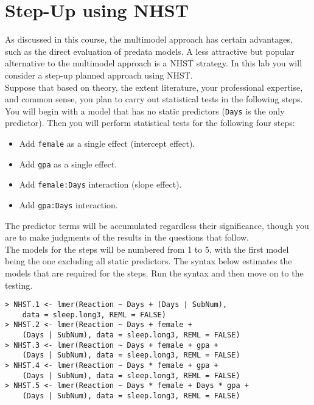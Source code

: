 \documentclass[]{article}
\begin{document}
%
%

\section*{Step-Up using NHST}

\noindent As discussed in this course, the multimodel approach has certain advantages, such as the direct evaluation of predata models. A less attractive but popular alternative to the multimodel approach is a NHST strategy. In this lab you will consider a step-up planned approach using NHST.\\
\linebreak
Suppose that based on theory, the extent literature, your professional expertise, and common sense, you plan to carry out statistical tests in the following steps. You will begin with a model that has no static predictors (\texttt{Days} is the only predictor). Then you will perform statistical tests for the following four steps:

\begin{itemize}
\item Add \texttt{female} as a single effect (intercept effect).
\item Add \texttt{gpa} as a single effect.
\item Add \texttt{female:Days} interaction (slope effect).
\item Add \texttt{gpa:Days} interaction.
\end{itemize}

\noindent The predictor terms will be accumulated regardless their significance, though you are to make
judgments of the results in the questions that follow.\\
\linebreak
The models for the steps will be numbered from 1 to 5, with the first model being the one excluding all static predictors. The syntax below estimates the models that are required for the steps. Run the syntax and then move on to the testing.

\begin{shaded}
\begin{lstlisting}
> NHST.1 <- lmer(Reaction ~ Days + (Days | SubNum), 
    data = sleep.long3, REML = FALSE)
> NHST.2 <- lmer(Reaction ~ Days + female + 
    (Days | SubNum), data = sleep.long3, REML = FALSE)
> NHST.3 <- lmer(Reaction ~ Days + female + gpa + 
    (Days | SubNum), data = sleep.long3, REML = FALSE)
> NHST.4 <- lmer(Reaction ~ Days * female + gpa + 
    (Days | SubNum), data = sleep.long3, REML = FALSE)
> NHST.5 <- lmer(Reaction ~ Days * female + Days * gpa + 
    (Days | SubNum), data = sleep.long3, REML = FALSE)
\end{lstlisting}
\end{shaded}
\end{document}

